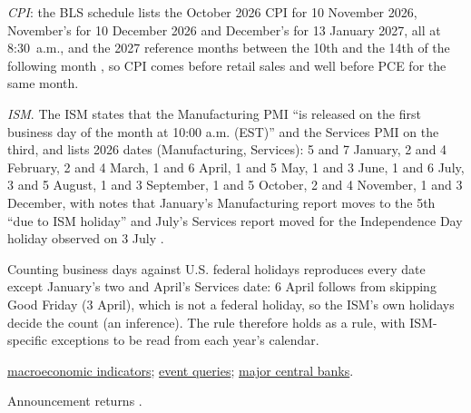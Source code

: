 \begin{qfdata}
\emph{CPI}: the BLS schedule lists the October 2026 CPI for 10 November 2026, November's for 10 December 2026 and December's for 13 January 2027, all at 8:30~a.m., and the 2027 reference months between the 10th and the 14th of the following month \citep[CPI release schedule]{bls-cpi-schedule}, so CPI comes before retail sales and well before PCE for the same month.

\emph{ISM}. The ISM states that the Manufacturing PMI ``is released on the first business day of the month at 10:00 a.m. (EST)'' and the Services PMI on the third, and lists 2026 dates (Manufacturing, Services): 5 and 7 January, 2 and 4 February, 2 and 4 March, 1 and 6 April, 1 and 5 May, 1 and 3 June, 1 and 6 July, 3 and 5 August, 1 and 3 September, 1 and 5 October, 2 and 4 November, 1 and 3 December, with notes that January's Manufacturing report moves to the 5th ``due to ISM holiday'' and July's Services report moved for the Independence Day holiday observed on 3 July \citep[2026 calendar, p.~1]{ism-calendar-2026}.

Counting business days against U.S. federal holidays reproduces every date except January's two and April's Services date: 6 April follows from skipping Good Friday (3 April), which is not a federal holiday, so the ISM's own holidays decide the count (an inference). The rule therefore holds as a rule, with ISM-specific exceptions to be read from each year's calendar.

 \hyperref[def:macroeconomic-indicators]{macroeconomic indicators}; \hyperref[meth:macro-event-queries]{event queries}; \hyperref[rule:major-central-banks-current]{major central banks}.

 Announcement returns \citep{wide-savor-wilson-announcements}.

\end{qfdata}

